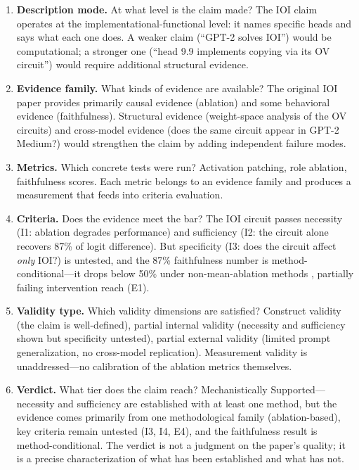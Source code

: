 \documentclass[10pt]{article}
\begin{document}
\begin{enumerate}[nosep]
\item \textbf{Description mode.} At what level is the claim made? The IOI claim operates at the implementational-functional level: it names specific heads and says what each one does. A weaker claim (``GPT-2 solves IOI'') would be computational; a stronger one (``head 9.9 implements copying via its OV circuit'') would require additional structural evidence.

\item \textbf{Evidence family.} What kinds of evidence are available? The original IOI paper provides primarily causal evidence (ablation) and some behavioral evidence (faithfulness). Structural evidence (weight-space analysis of the OV circuits) and cross-model evidence (does the same circuit appear in GPT-2 Medium?) would strengthen the claim by adding independent failure modes.

\item \textbf{Metrics.} Which concrete tests were run? Activation patching, role ablation, faithfulness scores. Each metric belongs to an evidence family and produces a measurement that feeds into criteria evaluation.

\item \textbf{Criteria.} Does the evidence meet the bar? The IOI circuit passes necessity (I1: ablation degrades performance) and sufficiency (I2: the circuit alone recovers 87\% of logit difference). But specificity (I3: does the circuit affect \emph{only} IOI?) is untested, and the 87\% faithfulness number is method-conditional---it drops below 50\% under non-mean-ablation methods \citep{miller2024transformer}, partially failing intervention reach (E1).

\item \textbf{Validity type.} Which validity dimensions are satisfied? Construct validity (the claim is well-defined), partial internal validity (necessity and sufficiency shown but specificity untested), partial external validity (limited prompt generalization, no cross-model replication). Measurement validity is unaddressed---no calibration of the ablation metrics themselves.

\item \textbf{Verdict.} What tier does the claim reach? Mechanistically Supported---necessity and sufficiency are established with at least one method, but the evidence comes primarily from one methodological family (ablation-based), key criteria remain untested (I3, I4, E4), and the faithfulness result is method-conditional. The verdict is not a judgment on the paper's quality; it is a precise characterization of what has been established and what has not.
\end{enumerate}
\end{document}
